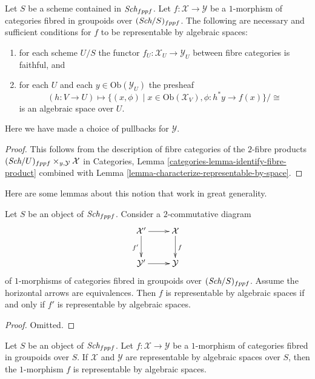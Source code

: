 \begin{lemma}
\label{lemma-criterion-map-representable-spaces-fibred-in-groupoids}
Let $S$ be a scheme contained in $\textit{Sch}_{fppf}$.
Let $f : \mathcal{X} \to \mathcal{Y}$ be a $1$-morphism
of categories fibred in groupoids over $(\textit{Sch}/S)_{fppf}$.
The following are necessary and sufficient conditions for
$f$ to be representable by algebraic spaces:
\begin{enumerate}
\item for each scheme $U/S$ the
functor $f_U : \mathcal{X}_U \longrightarrow \mathcal{Y}_U$
between fibre categories is faithful, and
\item for each $U$ and each $y \in \text{Ob}(\mathcal{Y}_U)$ the presheaf
$$
(h : V \to U)
\longmapsto
\{(x, \phi) \mid x \in \text{Ob}(\mathcal{X}_V), \phi : h^*y \to f(x)\}/\cong
$$
is an algebraic space over $U$.
\end{enumerate}
Here we have made a choice of pullbacks for $\mathcal{Y}$.
\end{lemma}

\begin{proof}
This follows from the description of fibre categories of the $2$-fibre products
$(\textit{Sch}/U)_{fppf} \times_{y, \mathcal{Y}} \mathcal{X}$ in
Categories, Lemma \ref{categories-lemma-identify-fibre-product}
combined with
Lemma \ref{lemma-characterize-representable-by-space}.
\end{proof}

\noindent
Here are some lemmas about this notion that work in great generality.

\begin{lemma}
\label{lemma-representable-by-spaces-morphism-equivalent}
Let $S$ be an object of $\textit{Sch}_{fppf}$.
Consider a $2$-commutative diagram
$$
\xymatrix{
\mathcal{X}' \ar[r] \ar[d]_{f'} & \mathcal{X} \ar[d]^f \\
\mathcal{Y}' \ar[r] & \mathcal{Y}
}
$$
of $1$-morphisms of categories fibred in groupoids over
$(\textit{Sch}/S)_{fppf}$.
Assume the horizontal arrows are equivalences.
Then $f$ is representable by algebraic spaces
if and only if $f'$ is representable by algebraic spaces.
\end{lemma}

\begin{proof}
Omitted.
\end{proof}

\begin{lemma}
\label{lemma-morphism-spaces-gives-representable-by-spaces}
Let $S$ be an object of $\textit{Sch}_{fppf}$.
Let $f : \mathcal{X} \to \mathcal{Y}$
be a $1$-morphism of categories fibred in groupoids over $S$.
If $\mathcal{X}$ and $\mathcal{Y}$ are representable by
algebraic spaces over $S$, then the $1$-morphism $f$
is representable by algebraic spaces.
\end{lemma}

